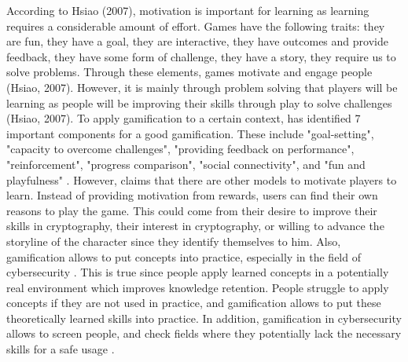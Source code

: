 \documentclass{l4proj}
\begin{document}
According to Hsiao (2007), motivation is important for learning as learning requires a considerable amount of effort. 
Games have the following traits: they are fun, they have a goal, they are interactive, they have outcomes and provide feedback, they have some form of challenge, 
they have a story, they require us to solve problems. Through these elements, games motivate and engage people (Hsiao, 2007). 
However, it is mainly through problem solving that players will be learning as people will be improving their skills through play to solve challenges (Hsiao, 2007).
To apply gamification to a certain context, \citet{cugelman_gamification:_2013} has identified 7 important components for a good gamification. 
These include "goal-setting", "capacity to overcome challenges", "providing feedback on performance", "reinforcement", "progress comparison", "social connectivity", 
and "fun and playfulness" \citep{cugelman_gamification:_2013}. 
However, \citet{nicholson_recipe_2015} claims that there are other models to motivate players to learn. Instead of providing motivation from rewards, 
users can find their own reasons to play the game. This could come from their desire to improve their skills in cryptography, their interest in cryptography, or 
willing to advance the storyline of the character since they identify themselves to him.
Also, gamification allows to put concepts into practice, especially in the field of cybersecurity \citep{wolfenden_gamification_2019}. 
This is true since people apply learned concepts in a potentially real environment which improves knowledge retention. 
People struggle to apply concepts if they are not used in practice, and gamification allows to put these theoretically learned skills into practice.
In addition, gamification in cybersecurity allows to screen people,
and check fields where they potentially lack the necessary skills for a safe usage \citep{adams_cybersecurity_2015}.
\end{document}
